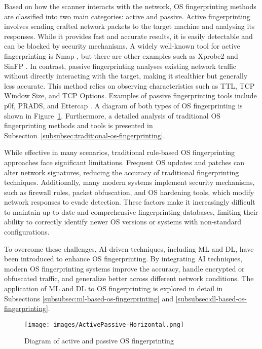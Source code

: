 Based on how the scanner interacts with the network, OS fingerprinting methods are classified into two main categories: active and passive. Active fingerprinting involves sending crafted network packets to the target machine and analysing its responses. While it provides fast and accurate results, it is easily detectable and can be blocked by security mechanisms. A widely well-known tool for active fingerprinting is Nmap \cite{nmaporg_nmap_nodate}, but there are other examples such as Xprobe2 and SinFP \cite{nmap_os_detection, xprobe2, sinfp}. In contrast, passive fingerprinting analyses existing network traffic without directly interacting with the target, making it stealthier but generally less accurate. This method relies on observing characteristics such as TTL, TCP Window Size, and TCP Options. Examples of passive fingerprinting tools include p0f, PRADS, and Ettercap \cite{zalewski_p0f_nodate, eb_fjellskal_prads_2009, ornaghi_alberto_ettercap_2001}. A diagram of both types of OS fingerprinting is shown in Figure~\ref{fig:active-passive}. Furthermore, a detailed analysis of traditional OS fingerprinting methods and tools is presented in Subsection~\ref{subsubsec:traditional-os-fingerprinting}. 

While effective in many scenarios, traditional rule-based OS fingerprinting approaches face significant limitations. Frequent OS updates and patches can alter network signatures, reducing the accuracy of traditional fingerprinting techniques. Additionally, many modern systems implement security mechanisms, such as firewall rules, packet obfuscation, and OS hardening tools, which modify network responses to evade detection. These factors make it increasingly difficult to maintain up-to-date and comprehensive fingerprinting databases, limiting their ability to correctly identify newer OS versions or systems with non-standard configurations.

To overcome these challenges, AI-driven techniques, including ML and DL, have been introduced to enhance OS fingerprinting. By integrating AI techniques, modern OS fingerprinting systems improve the accuracy, handle encrypted or obfuscated traffic, and generalize better across different network conditions. The application of ML and DL to OS fingerprinting is explored in detail in Subsections \ref{subsubsec:ml-based-os-fingerprinting} and \ref{subsubsec:dl-based-os-fingerprinting}.

\begin{figure}[t!]
    \centering
    \texttt{[image: images/ActivePassive-Horizontal.png]}    
    \caption{Diagram of active and passive OS fingerprinting}
    \label{fig:active-passive}
\end{figure}


